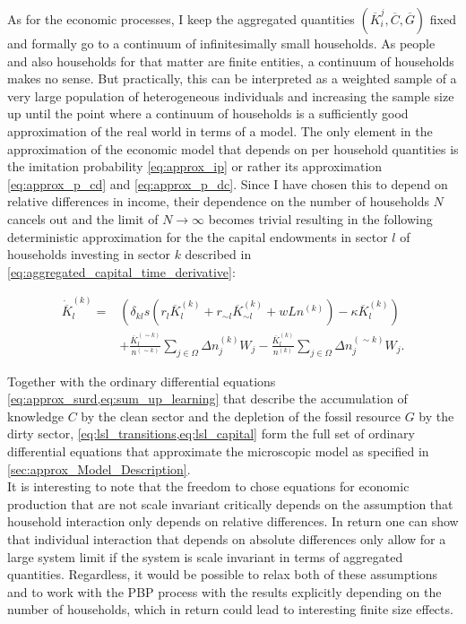 As for the economic processes, I keep the aggregated quantities $(\overbar{K}_i^j, \overbar{C}, \overbar{G})$ fixed and formally go to a continuum of infinitesimally small households. As people and also households for that matter are finite entities, a continuum of households makes no sense. But practically, this can be interpreted as a weighted sample of a very large population of heterogeneous individuals and increasing the sample size up until the point where a continuum of households is a sufficiently good approximation of the real world in terms of a model. 
The only element in the approximation of the economic model that depends on per household quantities is the imitation probability \cref{eq:approx_ip} or rather its approximation \cref{eq:approx_p_cd} and \cref{eq:approx_p_dc}. Since I have chosen this to depend on relative differences in income, their dependence on the number of households $N$ cancels out and the limit of $N \rightarrow \infty$ becomes trivial resulting in the following deterministic approximation for the the capital endowments in sector $l$ of households investing in sector $k$ described in  \cref{eq:aggregated_capital_time_derivative}:

\begin{align}
  \dot{\overbar{K}}_l^{(k)} = &  \left(\delta_{kl} s\left( r_l \overbar{K}_l^{(k)} + r_{\sim l} \overbar{K}_{\sim l}^{(k)} + w  L n^{(k)} \right) - \kappa \overbar{K}_l^{(k)} \right) \nonumber \\
  &+ \frac{\overbar{K}_l^{(\sim k)}}{n^{(\sim k)}}\sum_{j \in \Omega} \Delta n_j^{(k)} W_j - \frac{\overbar{K}_l^{(k)}}{n^{(k)}}\sum_{j \in \Omega} \Delta n_j^{(\sim k)}W_j.
  \label{eq:lsl_capital}
\end{align}

Together with the ordinary differential equations \cref{eq:approx_surd,eq:sum_up_learning} that describe the accumulation of knowledge $C$ by the clean sector and the depletion of the fossil resource $G$ by the dirty sector, \cref{eq:lsl_transitions,eq:lsl_capital} form the full set of ordinary differential equations that approximate the microscopic model as specified in \cref{sec:approx_Model_Description}.\\

It is interesting to note that the freedom to chose equations for economic production that are not scale invariant critically depends on the assumption that household interaction only depends on relative differences. In return one can show that individual interaction that depends on absolute differences only allow for a large system limit if the system is scale invariant in terms of aggregated quantities. Regardless, it would be possible to relax both of these assumptions and to work with the PBP process with the results explicitly depending on the number of households, which in return could lead to interesting finite size effects.


